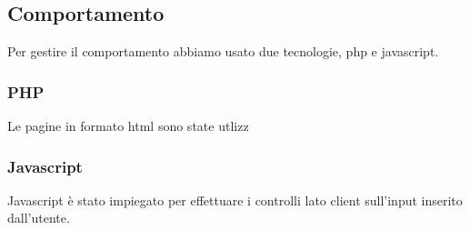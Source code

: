\documentclass[1_relazione.tex]{subfiles}
\begin{document}
\subsection{Comportamento}
Per gestire il comportamento abbiamo usato due tecnologie, php e javascript.

\subsubsection{PHP}
Le pagine in formato html sono state utlizz


\subsubsection{Javascript}
Javascript \`{e} stato impiegato per effettuare i controlli lato client sull'input inserito dall'utente.
\end{document}
